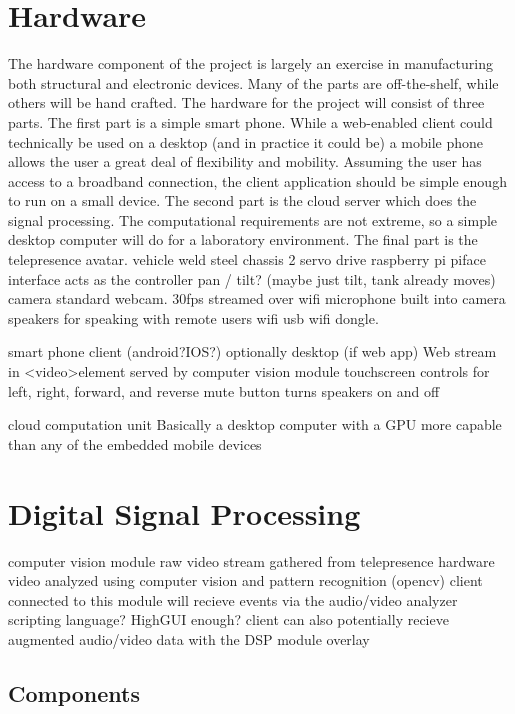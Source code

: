 \documentclass[final,a4paper,12pt]{report}
\begin{document}
\section{Hardware}
	The hardware component of the project is largely an exercise in manufacturing both structural and electronic devices. Many of the parts are off-the-shelf, while others will be hand crafted. The hardware for the project will consist of three parts. 
	The first part is a simple smart phone. While a web-enabled client could technically be used on a desktop (and in practice it could be) a mobile phone allows the user a great deal of flexibility and mobility. Assuming the user has access to a broadband connection, the client application should be simple enough to run on a small device. 
	The second part is the cloud server which does the signal processing. The computational requirements are not extreme, so a simple desktop computer will do for a laboratory environment.
	The final part is the telepresence avatar.
	vehicle
		weld steel chassis
		2 servo drive
			raspberry pi piface interface acts as the controller
			pan / tilt? (maybe just tilt, tank already moves)
		camera
			standard webcam. 30fps streamed over wifi
		microphone
			built into camera
		speakers
			for speaking with remote users
		wifi
			usb wifi dongle.

	smart phone client (android?IOS?) optionally desktop (if web app)
		Web stream in \textless video\textgreater element served by computer vision module
		touchscreen controls for left, right, forward, and reverse
		mute button turns speakers on and off
	
	cloud computation unit
		Basically a desktop computer with a GPU more capable than any of the embedded mobile devices
	
\section{Digital Signal Processing}
	computer vision module
	raw video stream gathered from telepresence hardware
	video analyzed using computer vision and pattern recognition (opencv)
	client connected to this module will recieve events via the audio/video analyzer
		scripting language? HighGUI enough?
	client can also potentially recieve augmented audio/video data with the DSP module overlay
	
\subsection{Components}
\end{document}
